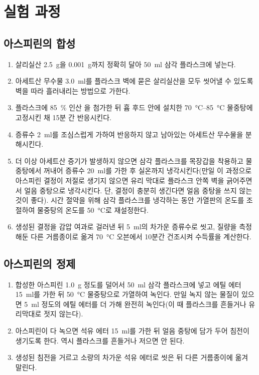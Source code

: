 \documentclass{GSHS-chemexp}
\begin{document}
	\section{실험 과정}
	
	\subsection{아스피린의 합성}
	\begin{enumerate}
		\item 살리실산 \SI{2.5}{\gram}을 \SI{0.001}{\gram}까지 정확히 
		달아 \SI{50}{\milli\litre} 삼각 플라스크에 넣는다.
		\item 아세트산 무수물 \SI{3.0}{\milli\litre}를
		플라스크 벽에 묻은 살리실산을 모두 씻어낼 수 있도록
		벽을 따라 흘러내리는 방법으로 가한다.
		\item 플라스크에 \SI{85}{\percent} 인산 
		을 첨가한 뒤 흄 후드 안에 설치한 
		\SIrange{70}{85}{\degreeCelsius} 물중탕에 고정시킨 채 
		\unit{15}{분} 간 반응시킨다.
		\item 증류수 \SI{2}{\milli\litre}를 조심스럽게 가하여
		반응하지 않고 남아있는 아세트산 무수물을 분해시킨다.
		\item 더 이상 아세트산 증기가 발생하지 않으면
		삼각 플라스크를 목장갑을 착용하고 물중탕에서 꺼내어
		증류수 \SI{20}{\milli\litre}를 가한 후
		실온까지 냉각시킨다(만일 이 과정으로 아스피린 결정이
		저절로 생기지 않으면 유리 막대로 플라스크 안쪽 벽을 긁어주면서
		얼음 중탕으로 냉각시킨다. 단, 결정이 충분히 생긴다면
		얼음 중탕을 쓰지 않는 것이 좋다).
		시간 절약을 위해 삼각 플라스크를 냉각하는 동안
		가열판의 온도를 조절하여 물중탕의 온도를
		\SI{50}{\degreeCelsius}로 재설정한다.
		\item 생성된 결정을 감압 여과로 걸러낸 뒤 \SI{5}{\milli\litre}의
		차가운 증류수로 씻고, 질량을 측정해둔 다른 거름종이로 옮겨
		\SI{70}{\degreeCelsius} 오븐에서 10분간 건조시켜 수득률을 계산한다.
	\end{enumerate}
	
	\subsection{아스피린의 정제}
	\begin{enumerate}
		\item 합성한 아스피린 \SI{1.0}{\gram} 정도를 덜어서
		\SI{50}{\milli\litre} 삼각 플라스크에 넣고
		에틸 에터 \SI{15}{\milli\litre}를 가한 뒤
		\SI{50}{\degreeCelsius} 물중탕으로 가열하여 녹인다.
		만일 녹지 않는 물질이 있으면 \SI{5}{\milli\litre} 정도의
		에틸 에터를 더 가해 완전히 녹인다(이 때 플라스크를 흔들거나
		유리막대로 젓지 않는다).
		\item 아스피린이 다 녹으면 석유 에터 \SI{15}{\milli\litre}를 
		가한 뒤 얼음 중탕에 담가 두어 침전이 생기도록 한다.
		역시 플라스크를 흔들거나 저으면 안 된다.
		\item 생성된 침전을 거르고 소량의 차가운 석유 에터로 씻은 뒤
		다른 거름종이에 옮겨 말린다.
	\end{enumerate}
	
\end{document}
